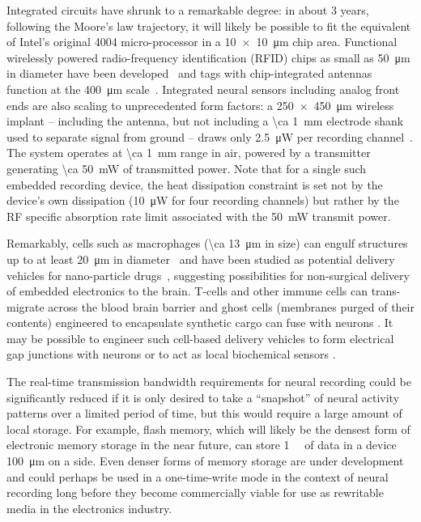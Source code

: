 Integrated circuits have shrunk to a remarkable degree: in about 3 years, following the Moore's law trajectory, it will likely be possible to fit the equivalent of Intel's original 4004 micro-processor in a \SI{10 x 10}{\micro\meter} chip area.
Functional wirelessly powered radio-frequency identification (RFID) chips as small as \SI{50}{\micro\meter} in diameter have been developed~\cite{Usami2007} and tags with chip-integrated antennas function at the \SI{400}{\micro\meter} scale~\cite{ImpinjMonzaFive}.
Integrated neural sensors including analog front ends are also scaling to unprecedented form factors: a \SI{250 x 450}{\micro\meter} wireless implant -- including the antenna, but not including a \SI{\ca 1}{\milli\meter} electrode shank used to separate signal from ground -- draws only \SI{2.5}{\micro\watt} per recording channel~\cite{biederman13}. The system operates at \SI{\ca 1}{\milli\meter} range in air, powered by a transmitter generating \SI{\ca 50}{\milli\watt} of transmitted power.
Note that for a single such embedded recording device, the heat dissipation constraint is set not by the device's own dissipation (\SI{10}{\micro\watt} for four recording channels) but rather by the RF specific absorption rate limit associated with the \SI{50}{\milli\watt} transmit power.

Remarkably, cells such as macrophages (\SI{\ca 13}{\micro\meter} in size) can engulf structures up to at least \SI{20}{\micro\meter} in diameter~\cite{cannon92} and have been studied as potential delivery vehicles for nano-particle drugs~\cite{Kadiu11}, suggesting possibilities for non-surgical delivery of embedded electronics to the brain. T-cells and other immune cells can trans-migrate across the blood brain barrier \cite{Engelhardt2006} and ghost cells (membranes purged of their contents) engineered to encapsulate synthetic cargo \cite{Cinti2011} can fuse with neurons \cite{Hikawa1989162}. It may be possible to engineer such cell-based delivery vehicles to form electrical gap junctions \cite{Spruston2001669} with neurons or to act as local biochemical sensors \cite{nguyen2009vivo}.

The real-time transmission bandwidth requirements for neural recording could be significantly reduced if it is only desired to take a ``snapshot'' of neural activity patterns over a limited period of time, but this would require a large amount of local storage. For example, flash memory, which will likely be the densest form of electronic memory storage in the near future, can store \SI{1}{\mega\bit} of data in a device \SI{100}{\micro\meter} on a side.
Even denser forms of memory storage are under development and could perhaps be used in a one-time-write mode in the context of neural recording long before they become commercially viable for use as rewritable media in the electronics industry.

